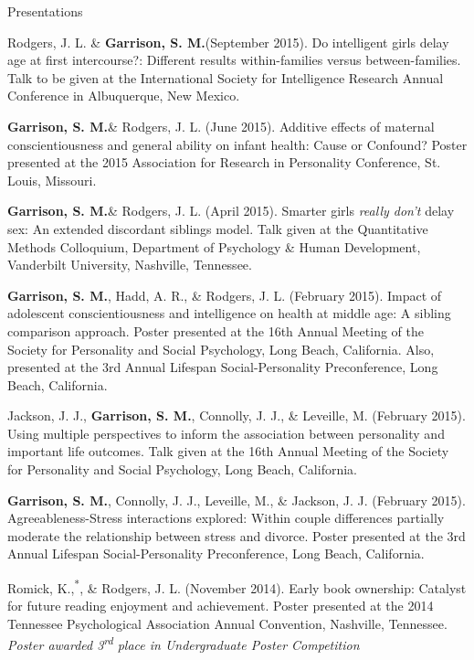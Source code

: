 \documentclass {resume}
\newcommand{\meb}{{\bf Garrison, S. M.}\xspace}
\newcommand{\student}{\hspace{-3.95pt}\textsuperscript{*}\hspace* {2 pt}}
\newlength{\wideitemsep}
\let\olditem\item
\renewcommand{\item}{\setlength{\itemsep}{\wideitemsep}\olditem}
\begin{document}
\begin{rSection}{\textrm{Presentations}}\begin{etaremune}
\item Rodgers, J. L. \& \meb (September 2015). Do intelligent girls delay age at first intercourse?:  Different results within-families versus between-families. Talk to be given at the International Society for Intelligence Research Annual Conference in Albuquerque, New Mexico.
\item \meb \& Rodgers, J. L. (June 2015). Additive effects of maternal conscientiousness and general ability on infant health: Cause or Confound? Poster presented at the 2015 Association for Research in Personality Conference, St. Louis, Missouri.%
\item\meb \& Rodgers, J. L. (April 2015). Smarter girls \textit{really don't} delay sex: An extended discordant siblings model. Talk given at the Quantitative Methods Colloquium, Department of Psychology \& Human Development, Vanderbilt University, Nashville, Tennessee.
\item \meb, Hadd, A. R., \& Rodgers, J. L. (February 2015). Impact of adolescent conscientiousness and intelligence on health at middle age: A sibling comparison approach. Poster presented at the 16th Annual Meeting of the Society for Personality and  Social Psychology, Long Beach, California. Also, presented at the 3rd Annual Lifespan Social-Personality Preconference, Long Beach, California.
\item Jackson, J. J., \textbf{Garrison, S. M.}, Connolly, J. J., \& Leveille, M. (February 2015). Using multiple perspectives to inform the association between personality and important life outcomes. Talk given at the 16th Annual Meeting of the Society for Personality and  Social Psychology, Long Beach, California.
\item\meb, Connolly, J. J., Leveille, M., \& Jackson, J. J. (February 2015). Agreeableness-Stress interactions explored: Within couple differences partially moderate the relationship between stress and divorce. Poster presented at the 3rd Annual Lifespan Social-Personality Preconference, Long Beach, California.
\item Romick, K.,\student \meb, \& Rodgers, J. L. (November 2014). Early book ownership: Catalyst for future reading enjoyment and achievement. Poster presented at the 2014 Tennessee Psychological Association Annual Convention, Nashville, Tennessee. \textit{Poster awarded 3\textsuperscript{rd} place in Undergraduate Poster Competition}

\end{etaremune}
\end{rSection}
\end{document}

